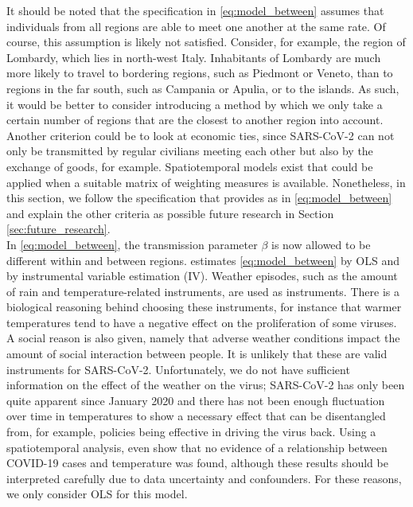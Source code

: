 \documentclass[12pt]{article}
\begin{document}
	It should be noted that the specification in \eqref{eq:model_between} assumes that individuals from all regions are able to meet one another at the same rate. Of course, this assumption is likely not satisfied. Consider, for example, the region of Lombardy, which lies in north-west Italy. Inhabitants of Lombardy are much more likely to travel to bordering regions, such as Piedmont or Veneto, than to regions in the far south, such as Campania or Apulia, or to the islands. As such, it would be better to consider introducing a method by which we only take a certain number of regions that are the closest to another region into account. Another criterion could be to look at economic ties, since SARS-CoV-2 can not only be transmitted by regular civilians meeting each other but also by the exchange of goods, for example. Spatiotemporal models exist that could be applied when a suitable matrix of weighting measures is available. Nonetheless, in this section, we follow the specification that \textcite{adda2016economic} provides as in \eqref{eq:model_between} and explain the other criteria as possible future research in Section \ref{sec:future_research}. \\
	
	
	In \eqref{eq:model_between}, the transmission parameter $\beta$ is now allowed to be different within and between regions. \textcite{adda2016economic} estimates \eqref{eq:model_between} by OLS and by instrumental variable estimation (IV). Weather episodes, such as the amount of rain and temperature-related instruments, are used as instruments. There is a biological reasoning behind choosing these instruments, for instance that warmer temperatures tend to have a negative effect on the proliferation of some viruses. A social reason is also given, namely that adverse weather conditions impact the amount of social interaction between people. It is unlikely that these are valid instruments for SARS-CoV-2. Unfortunately, we do not have sufficient information on the effect of the weather on the virus; SARS-CoV-2 has only been quite apparent since January 2020 and there has not been enough fluctuation over time in temperatures to show a necessary effect that can be disentangled from, for example, policies being effective in driving the virus back. Using a spatiotemporal analysis, \textcite{briz2020temperature} even show that no evidence of a relationship between COVID-19 cases and temperature was found, although these results should be interpreted carefully due to data uncertainty and confounders. For these reasons, we only consider OLS for this model. \\
	
\end{document}
